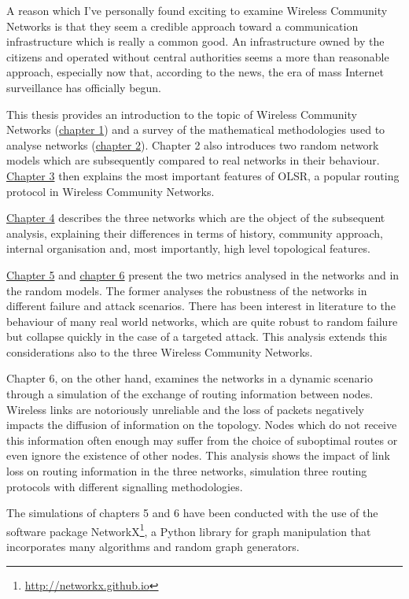\documentclass[oneside,openany]{memoir}
\begin{document}
A reason which I've personally found exciting to examine Wireless Community
Networks is that they seem a credible approach toward a communication
infrastructure which is really a common good. An infrastructure owned by the
citizens and operated without central authorities seems a more than reasonable
approach, especially now that, according to the news, the era of mass Internet
surveillance has officially begun.

This thesis provides an introduction to the topic of Wireless Community Networks
(\hyperref[wireless-community-networks]{chapter 1})
and a survey of the mathematical methodologies used to analyse networks
(\hyperref[network-topology-and-graphs]{chapter 2}).
Chapter 2 also introduces two random network models which are subsequently
compared to real networks in their behaviour.
\hyperref[olsr-survey]{Chapter 3} then explains the most important 
features of OLSR, a popular routing protocol in Wireless Community Networks.

\hyperref[the-networks]{Chapter 4} describes the three networks which are
the object of the subsequent analysis, explaining their differences in terms
of history, community approach, internal organisation and, most importantly,
high level topological features.

\hyperref[robustness-analysis]{Chapter 5} and
\hyperref[message-propagation-analysis]{chapter 6} present the two metrics
analysed in the networks and in the random models.
The former analyses the robustness of the networks in different failure and
attack scenarios. There has been interest in literature to the behaviour
of many real world networks, which are quite robust to random failure but
collapse quickly in the case of a targeted attack. This analysis
extends this considerations also to the three Wireless Community Networks.

Chapter 6, on the other hand, examines the networks in a dynamic scenario
through a simulation of the exchange of routing information between nodes.
Wireless links are notoriously unreliable and the loss of packets negatively
impacts the diffusion of information on the topology.
Nodes which do not receive this information often enough may suffer from the
choice of suboptimal routes or even ignore the existence of other nodes.
This analysis shows the impact of link loss on routing information
in the three networks, simulation three routing protocols with different
signalling methodologies.

The simulations of chapters 5 and 6 have been conducted with the use of the
software package NetworkX\footnote{\url{http://networkx.github.io}}, a Python
library for graph manipulation that incorporates many algorithms and random
graph generators.
\end{document}
